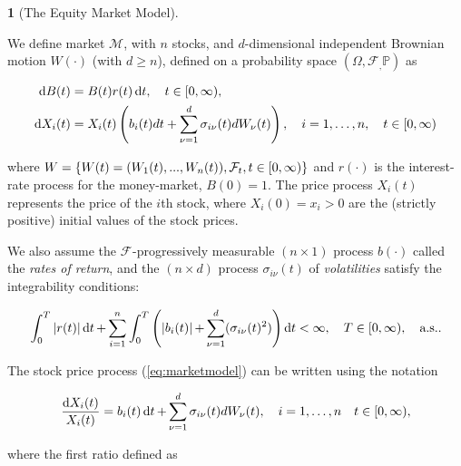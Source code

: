\documentclass[british]{amsart} \usepackage{lmodern}
\numberwithin{equation}{section} \numberwithin{figure}{section}
\theoremstyle{plain} \newtheorem{thm}{\protect\theoremname}[section]
\theoremstyle{definition} \newtheorem{defn}[thm]{\protect\definitionname}
\theoremstyle{plain} \newtheorem{assumption}[thm]{\protect\assumptionname}
\theoremstyle{plain} \newtheorem{lem}[thm]{\protect\lemmaname}
\theoremstyle{plain} \newtheorem{prop}[thm]{\protect\propositionname}
\theoremstyle{remark} \newtheorem{rem}[thm]{\protect\remarkname}
\theoremstyle{plain} \newtheorem{cor}[thm]{\protect\corollaryname}
\renewcommand{\d}[1]{\mathop{\mathrm{d}{#1}}}
\newcommand{\filtration}[1]{\mathcal{F}_{#1}}
\newcommand{\abs}[1]{\mathop{|{#1}|}} \newcommand{\market}{\mathcal{M}}
\newcommand{\rangei}{i=1,\dots,n} \newcommand{\measure}{\mathbb{P}}
\newcommand{\probabilityspace}{(\Omega,\filtration,\measure)}
\begin{document}
\begin{defn} [The Equity Market Model]
  \label{def:marketmodel}

  We define market $\market$, with $n$ stocks, and $d$-dimensional independent
  Brownian motion $W(\cdot)$ (with $d \ge n$), defined on a probability space 
  $\probabilityspace$ as

  \begin{gather}
    \label{eq:marketmodel}
    \begin{split}
      \d{B(t)} &= B(t)r(t)\d{t},  
        \quad \ranget, \\
      \d{X_{i}(t)} &= 
            X_{i}(t) 
            \left(
                b_{i}(t)dt + \sum_{\nu=1}^{d} \sigma_{i\nu}(t) dW_{\nu}(t)
            \right),
        \quad \rangei,
        \quad \ranget
    \end{split}
  \end{gather}

  where $W = \left\{ W(t)=(W_{1}(t),...,W_{n}(t)),\filtration{t},\ranget \right\}$
  and $r(\cdot)$ is the interest-rate process for the money-market, $B(0)=1$. The
  price process $X_{i}(t)$ represents the price of the $i$th stock, where
  $X_{i}(0) = x_{i} > 0$ are the (strictly positive) initial values of the stock
  prices.

  We also assume the $\filtration{}$-progressively measurable $(n \times 1)$
  process $b(\cdot)$ called the \textit{rates of return}, and the $(n \times d)$
  process $\sigma_{i\nu}(t)$ of \textit{volatilities} satisfy the integrability
  conditions: 

  \begin{equation*}
    \int_{0}^{T} 
    \abs{r(t)} 
    \d{t} +
    \sum_{i=1}^{n} \int_{0}^{T} 
      \left( 
          \abs{b_{i}(t)} +
          \sum_{\nu=1}^{d} ( \sigma_{i\nu}(t)^2  ) 
          \right) \d{t} < \infty,
    \quad T \in [0, \infty),
    \quad \almostsurely.
   \end{equation*}

\end{defn}

The stock price process (\ref{eq:marketmodel}) can be written using the notation 

\begin{equation}
  \label{eq:stockpriceprocessdiff}
    \frac{\d{X_{i}(t)}}{X_{i}(t)} = b_{i}(t)\d{t} + \sum_{\nu=1}^{d} \sigma_{i\nu}(t) dW_{\nu}(t),
  \quad \rangei
  \quad \ranget,
\end{equation}

where the first ratio defined as
\end{document}
